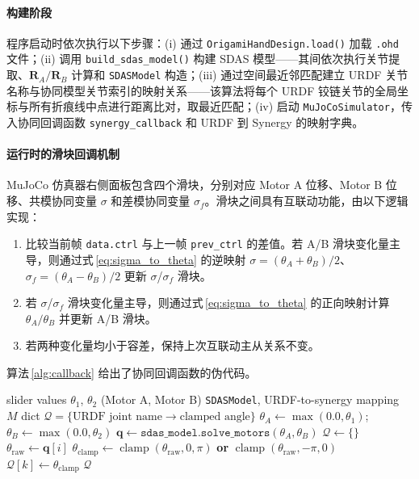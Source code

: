 \paragraph{构建阶段}

程序启动时依次执行以下步骤：(i) 通过 \texttt{OrigamiHandDesign.load()} 加载 \texttt{.ohd} 文件；(ii) 调用 \texttt{build\_sdas\_model()} 构建 SDAS 模型——其间依次执行关节提取、$\mathbf{R}_A/\mathbf{R}_B$ 计算和 \texttt{SDASModel} 构造；(iii) 通过空间最近邻匹配建立 URDF 关节名称与协同模型关节索引的映射关系——该算法将每个 URDF 铰链关节的全局坐标与所有折痕线中点进行距离比对，取最近匹配；(iv) 启动 \texttt{MuJoCoSimulator}，传入协同回调函数 \texttt{synergy\_callback} 和 URDF 到 Synergy 的映射字典。

\paragraph{运行时的滑块回调机制}

MuJoCo 仿真器右侧面板包含四个滑块，分别对应 Motor A 位移、Motor B 位移、共模协同变量 $\sigma$ 和差模协同变量 $\sigma_f$。滑块之间具有互联动功能，由以下逻辑实现：
\begin{enumerate}
    \item 比较当前帧 \texttt{data.ctrl} 与上一帧 \texttt{prev\_ctrl} 的差值。若 A/B 滑块变化量主导，则通过式\,\eqref{eq:sigma_to_theta} 的逆映射 $\sigma = (\theta_A + \theta_B)/2$、$\sigma_f = (\theta_A - \theta_B)/2$ 更新 $\sigma$/$\sigma_f$ 滑块。
    \item 若 $\sigma$/$\sigma_f$ 滑块变化量主导，则通过式\,\eqref{eq:sigma_to_theta} 的正向映射计算 $\theta_A/\theta_B$ 并更新 A/B 滑块。
    \item 若两种变化量均小于容差，保持上次互联动主从关系不变。
\end{enumerate}

算法\,\ref{alg:callback} 给出了协同回调函数的伪代码。

\begin{algorithm}[htbp]
\caption{MuJoCo 仿真器 \texttt{synergy\_callback} 回调函数}
\label{alg:callback}
\begin{algorithmic}[1]
\Require slider values $\theta_1$, $\theta_2$ (Motor A, Motor B)
\Require \texttt{SDASModel}, URDF-to-synergy mapping $M$
\Ensure dict $\mathcal{Q} = \{ \text{URDF joint name} \to \text{clamped angle} \}$
\State $\theta_A \gets \max(0.0, \theta_1)$; $\theta_B \gets \max(0.0, \theta_2)$
\State $\mathbf{q} \gets \texttt{sdas\_model.solve\_motors}(\theta_A, \theta_B)$
\State $\mathcal{Q} \gets \{\}$
        \State $\theta_{\text{raw}} \gets \mathbf{q}[i]$
        \State $\theta_{\text{clamp}} \gets \operatorname{clamp}(\theta_{\text{raw}}, 0, \pi)$  \textbf{or} $\operatorname{clamp}(\theta_{\text{raw}}, -\pi, 0)$ 
        \State $\mathcal{Q}[k] \gets \theta_{\text{clamp}}$
    \EndIf
\EndFor
{}
\Return $\mathcal{Q}$ 
\end{algorithmic}
\end{algorithm}

